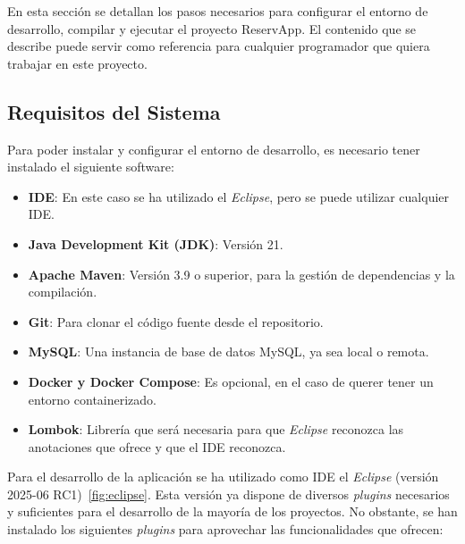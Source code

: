 En esta sección se detallan los pasos necesarios para configurar el entorno de desarrollo, compilar y ejecutar el proyecto ReservApp. El contenido que se describe puede servir como referencia para cualquier programador que quiera trabajar en este proyecto.

\subsection{Requisitos del Sistema}
Para poder instalar y configurar el entorno de desarrollo, es necesario tener instalado el siguiente software:
\begin{itemize}
   \item \textbf{IDE}: En este caso se ha utilizado el \textit{Eclipse}, pero se puede utilizar cualquier IDE.
   \item \textbf{Java Development Kit (JDK)}: Versión 21.
   \item \textbf{Apache Maven}: Versión 3.9 o superior, para la gestión de dependencias y la compilación.
   \item \textbf{Git}: Para clonar el código fuente desde el repositorio.
   \item \textbf{MySQL}: Una instancia de base de datos MySQL, ya sea local o remota.
   \item \textbf{Docker y Docker Compose}: Es opcional, en el caso de querer tener un entorno containerizado.
   \item \textbf{Lombok}: Librería que será necesaria para que \textit{Eclipse} reconozca las anotaciones que ofrece y que el IDE reconozca.
\end{itemize}


Para el desarrollo de la aplicación se ha utilizado como IDE el \textit{Eclipse} (versión 2025-06 RC1)~\ref{fig:eclipse}. Esta versión ya dispone de diversos \emph{plugins} necesarios y suficientes para el desarrollo de la mayoría de los proyectos. No obstante, se han instalado los siguientes \emph{plugins} para aprovechar las funcionalidades que ofrecen:

